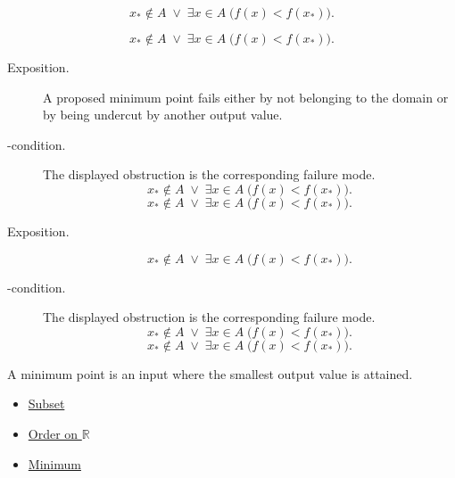 \begin{remark*}
\[
  x_*\notin A\;\vee\;\exists x\in A\;\bigl(f(x)<f(x_*)\bigr).
\]
\end{remark*}

\begin{remark*}
\[
  x_*\notin A\;\vee\;\exists x\in A\;\bigl(f(x)<f(x_*)\bigr).
\]
\end{remark*}



\begin{remark*}
\begin{description}
  \item[Exposition.]
A proposed minimum point fails either by not belonging to the domain or by
being undercut by another output value.


  \item[\exists-condition.]
  The displayed obstruction is the corresponding failure mode.
  \[
  x_*\notin A\;\vee\;\exists x\in A\;\bigl(f(x)<f(x_*)\bigr).
\]
  \[
  x_*\notin A\;\vee\;\exists x\in A\;\bigl(f(x)<f(x_*)\bigr).
\]
\end{description}
\end{remark*}

\begin{remark*}
\begin{description}
  \item[Exposition.]
\[
  x_*\notin A
  \;\vee\;
  \exists x\in A\;\bigl(f(x)<f(x_*)\bigr).
\]


  \item[\exists-condition.]
  The displayed obstruction is the corresponding failure mode.
  \[
  x_*\notin A\;\vee\;\exists x\in A\;\bigl(f(x)<f(x_*)\bigr).
\]
  \[
  x_*\notin A\;\vee\;\exists x\in A\;\bigl(f(x)<f(x_*)\bigr).
\]
\end{description}
\end{remark*}

\begin{remark*}[Interpretation]
A minimum point is an input where the smallest output value is attained.
\end{remark*}

\begin{dependencies}
\begin{itemize}
  \item \hyperref[def:subset]{Subset}
  \item \hyperref[def:order-on-r]{Order on $\mathbb{R}$}
  \item \hyperref[def:minimum]{Minimum}
\end{itemize}
\end{dependencies}

